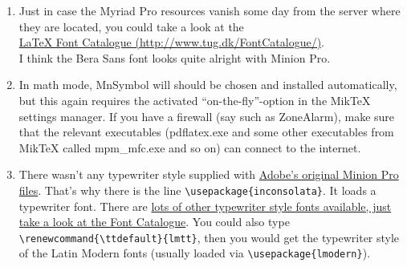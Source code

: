 \begin{enumerate}
	\item Just in case the Myriad Pro resources vanish some day from the server where they are located, you could take a look at the\\
	\href{http://www.tug.dk/FontCatalogue/}{\LaTeX{} Font Catalogue (http://www.tug.dk/FontCatalogue/)}.\\
	I think the Bera Sans font looks quite alright with Minion Pro.
	\item In math mode, MnSymbol will should be chosen and installed automatically, but this again requires the activated ``on-the-fly''-option in the MikTeX settings manager. If you have a firewall (say such as ZoneAlarm), make sure that the relevant executables (pdflatex.exe and some other executables from MikTeX called mpm\_mfc.exe and so on) can connect to the internet.
	\item There wasn't any typewriter style supplied with \href{http://www.adobe.com/type/browser/P/P_1719.html}{Adobe's original Minion Pro files}. That's why there is the line \verb+\usepackage{inconsolata}+. It loads a typewriter font. There are \href{http://www.tug.dk/FontCatalogue/typewriterfonts.html}{lots of other typewriter style fonts available, just take a look at the Font Catalogue}. You could also type \verb+\renewcommand{\ttdefault}{lmtt}+, then you would get the typewriter style of the Latin Modern fonts (usually loaded via \verb+\usepackage{lmodern}+).
\end{enumerate}
%